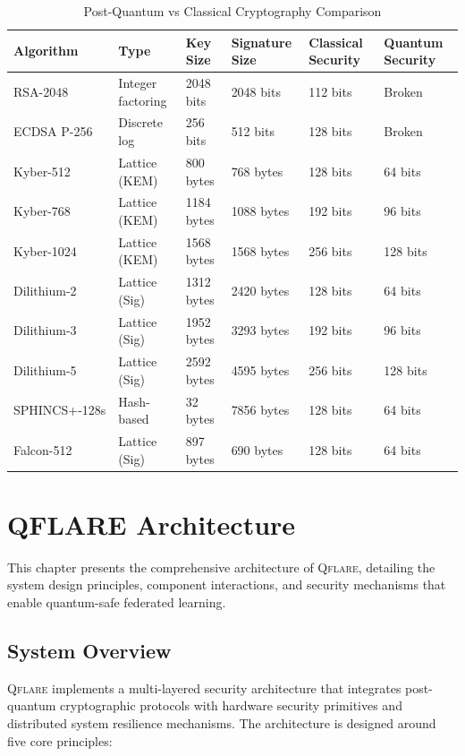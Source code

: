 \documentclass[12pt,a4paper,twoside]{book}
\newcommand{\qflare}{\textsc{Qflare}}
\begin{document}
\begin{table}[htbp]
\centering
\caption{Post-Quantum vs Classical Cryptography Comparison}
\label{tab:pqc-classical-comparison}
\begin{tabular}{@{}p{2.5cm}p{2cm}p{2cm}p{2cm}p{2cm}p{2cm}@{}}
\toprule
\textbf{Algorithm} & \textbf{Type} & \textbf{Key Size} & \textbf{Signature Size} & \textbf{Classical Security} & \textbf{Quantum Security} \\
\midrule
RSA-2048 & Integer factoring & 2048 bits & 2048 bits & 112 bits & Broken \\
ECDSA P-256 & Discrete log & 256 bits & 512 bits & 128 bits & Broken \\
Kyber-512 & Lattice (KEM) & 800 bytes & 768 bytes & 128 bits & 64 bits \\
Kyber-768 & Lattice (KEM) & 1184 bytes & 1088 bytes & 192 bits & 96 bits \\
Kyber-1024 & Lattice (KEM) & 1568 bytes & 1568 bytes & 256 bits & 128 bits \\
Dilithium-2 & Lattice (Sig) & 1312 bytes & 2420 bytes & 128 bits & 64 bits \\
Dilithium-3 & Lattice (Sig) & 1952 bytes & 3293 bytes & 192 bits & 96 bits \\
Dilithium-5 & Lattice (Sig) & 2592 bytes & 4595 bytes & 256 bits & 128 bits \\
SPHINCS+-128s & Hash-based & 32 bytes & 7856 bytes & 128 bits & 64 bits \\
Falcon-512 & Lattice (Sig) & 897 bytes & 690 bytes & 128 bits & 64 bits \\
\bottomrule
\end{tabular}
\end{table}

\chapter{QFLARE Architecture}
\label{ch:architecture}

This chapter presents the comprehensive architecture of \qflare{}, detailing the system design principles, component interactions, and security mechanisms that enable quantum-safe federated learning.

\section{System Overview}
\label{sec:system-overview}

\qflare{} implements a multi-layered security architecture that integrates post-quantum cryptographic protocols with hardware security primitives and distributed system resilience mechanisms. The architecture is designed around five core principles:
\end{document}
